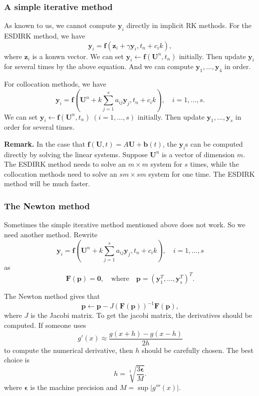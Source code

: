 \documentclass[9pt]{beamer}
\begin{document}
\begin{frame}
  \frametitle{A simple iterative method}

  As known to us, we cannot compute $\mathbf{y}_i$ directly in implicit RK methods. For the ESDIRK method, we have
  \begin{equation*}
    \mathbf{y}_i=\mathbf{f}(\mathbf{z}_i+\gamma \mathbf{y}_i,t_n+c_ik),
  \end{equation*}
  where $\mathbf{z}_i$ is a konwn vector. We can set $\mathbf{y}_i\gets\mathbf{f}(\mathbf{U}^n,t_n)$ initially. Then update $\mathbf{y}_i$ for several times by the above equation. And we can compute $\mathbf{y}_1,...,\mathbf{y}_4$ in order.

  For collocation methods, we have
  \begin{equation*}
    \mathbf{y}_i=\mathbf{f}\left(\mathbf{U}^n+k\sum_{j=1}^s a_{ij} \mathbf{y}_j,t_n+c_ik\right),\quad i=1,...,s.
  \end{equation*}
  We can set $\mathbf{y}_i\gets\mathbf{f}(\mathbf{U}^n,t_n)\;(i=1,...,s)$ initially. Then update $\mathbf{y}_1,...,\mathbf{y}_s$ in order for several times.

  \textbf{Remark.} In the case that $\mathbf{f}(\mathbf{U},t)=A\mathbf{U}+\mathbf{b}(t)$, the $\mathbf{y}_i$s can be computed directly by solving the linear systems. Suppose $\mathbf{U}^n$ is a vector of dimension $m$. The ESDIRK method needs to solve an $m\times m$ system for $s$ times, while the collocation methods need to solve an $sm\times sm$ system for one time. The ESDIRK method will be much faster.
\end{frame}

\begin{frame}
  \frametitle{The Newton method}
  Sometimes the simple iterative method mentioned above does not work. So we need another method. Rewrite
  \begin{equation*}
    \mathbf{y}_i=\mathbf{f}\left(\mathbf{U}^n+k\sum_{j=1}^s a_{ij} \mathbf{y}_j,t_n+c_ik\right),\quad i=1,...,s
  \end{equation*}
  as
  \begin{equation*}
    \mathbf{F}(\mathbf{p})=\mathbf{0}, \quad \text{where} \quad \mathbf{p}=(\mathbf{y}_1^T,...,\mathbf{y}_s^T)^T.
  \end{equation*}

  The Newton method gives that
  \begin{equation*}
    \mathbf{p}\gets \mathbf{p}-J(\mathbf{F}(\mathbf{p}))^{-1}\mathbf{F}(\mathbf{p}),
  \end{equation*}
  where $J$ is the Jacobi matrix. To get the jacobi matrix, the derivatives should be computed. If someone uses
  \begin{equation*}
    g'(x)\approx \frac{g(x+h)-g(x-h)}{2h}
  \end{equation*}
  to compute the numerical derivative, then $h$ should be carefully chosen. The best choice is
  \begin{equation*}
    h=\sqrt[3]{\frac{3\mathbf{\epsilon}}{M}}.
  \end{equation*}
  where $\mathbf{\epsilon}$ is the machine precision and $M=\sup |g'''(x)|$.
\end{frame}
\end{document}
